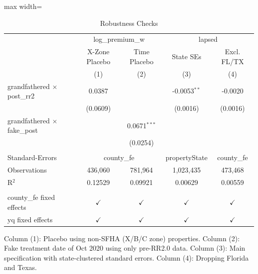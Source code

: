 \begin{table}[htbp]
   \caption{\label{tab:robustness} Robustness Checks}
   \bigskip
   \centering
   \begin{adjustbox}{max width=\textwidth}
   \begin{tabular}{lcccc}
      \toprule
       & \multicolumn{2}{c}{log\_premium\_w} & \multicolumn{2}{c}{lapsed}\\
                                          & X-Zone Placebo & Time Placebo   & State SEs      & Excl. FL/TX \\   
                                          & (1)            & (2)            & (3)            & (4)\\  
      \midrule 
      grandfathered $\times$ post\_rr2    & 0.0387         &                & -0.0053$^{**}$ & -0.0020\\   
                                          & (0.0609)       &                & (0.0016)       & (0.0016)\\   
      grandfathered $\times$ fake\_post   &                & 0.0671$^{***}$ &                &   \\   
                                          &                & (0.0254)       &                &   \\   
       \\
      Standard-Errors & \multicolumn{2}{c}{county\_fe} & propertyState & county\_fe \\ 
      Observations                        & 436,060        & 781,964        & 1,023,435      & 473,468\\  
      R$^2$                               & 0.12529        & 0.09921        & 0.00629        & 0.00559\\  
       \\
      county\_fe fixed effects            & $\checkmark$   & $\checkmark$   & $\checkmark$   & $\checkmark$\\   
      yq fixed effects                    & $\checkmark$   & $\checkmark$   & $\checkmark$   & $\checkmark$\\   
      \bottomrule
   \end{tabular}
   \end{adjustbox}

   \par \raggedright 
   Column (1): Placebo using non-SFHA (X/B/C zone) properties. Column (2): Fake treatment date of Oct 2020 using only pre-RR2.0 data. Column (3): Main specification with state-clustered standard errors. Column (4): Dropping Florida and Texas.
\end{table}
